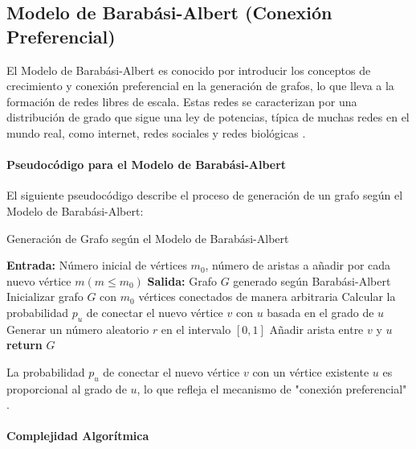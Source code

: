 \subsection{Modelo de Barabási-Albert (Conexión Preferencial)}

El Modelo de Barabási-Albert es conocido por introducir los conceptos de crecimiento y conexión preferencial en la generación de grafos, lo que lleva a la formación de redes libres de escala. Estas redes se caracterizan por una distribución de grado que sigue una ley de potencias, típica de muchas redes en el mundo real, como internet, redes sociales y redes biológicas \citep{Barabasi1999} .

\paragraph{Pseudocódigo para el Modelo de Barabási-Albert}

El siguiente pseudocódigo describe el proceso de generación de un grafo según el Modelo de Barabási-Albert:
\newpage

\begin{algorithm}
\caption{Generación de Grafo según el Modelo de Barabási-Albert}
\begin{algorithmic}[1]
\State \textbf{Entrada:} Número inicial de vértices $m_0$, número de aristas a añadir por cada nuevo vértice $m (m \leq m_0)$
\State \textbf{Salida:} Grafo $G$ generado según Barabási-Albert
    \State Inicializar grafo $G$ con $m_0$ vértices conectados de manera arbitraria
            \State Calcular la probabilidad $p_u$ de conectar el nuevo vértice $v$ con $u$ basada en el grado de $u$
            \State Generar un número aleatorio $r$ en el intervalo $[0, 1]$
                \State Añadir arista entre $v$ y $u$
            \EndIf
        \EndFor
    \EndFor
    \State \textbf{return} $G$
\EndProcedure
\end{algorithmic}
\end{algorithm}

La probabilidad $p_u$ de conectar el nuevo vértice $v$ con un vértice existente $u$ es proporcional al grado de $u$, lo que refleja el mecanismo de "conexión preferencial" .

\paragraph{Complejidad Algorítmica}

